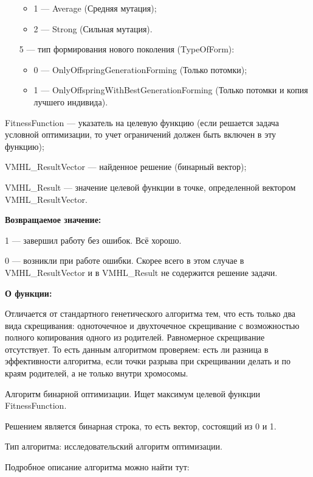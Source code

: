 \documentclass[a4paper,12pt]{article}
\begin{document}
\begin{itemize}
\begin{itemize}
       \item 1 --- Average (Средняя мутация);
 
       \item 2 --- Strong (Сильная мутация).
	    \end{itemize}
 
 \item [5] --- тип формирования нового поколения (TypeOfForm):
  \begin{itemize}
       \item 0 --- OnlyOffspringGenerationForming (Только потомки);
 
       \item 1 --- OnlyOffspringWithBestGenerationForming (Только потомки и копия лучшего индивида).
	    \end{itemize}
 \end{itemize}
 
FitnessFunction --- указатель на целевую функцию (если решается задача условной оптимизации, то учет ограничений должен быть включен в эту функцию);
 
VMHL\_ResultVector --- найденное решение (бинарный вектор);
 
VMHL\_Result --- значение целевой функции в точке, определенной вектором VMHL\_ResultVector.

\textbf{Возвращаемое значение:} 

 1 --- завершил работу без ошибок. Всё хорошо.
 
 0 --- возникли при работе ошибки. Скорее всего в этом случае в VMHL\_ResultVector и в VMHL\_Result не содержится решение задачи.

\textbf{О функции:}

Отличается от стандартного генетического алгоритма тем, что есть только два вида скрещивания: одноточечное и двухточечное скрещивание с возможностью полного копирования одного из родителей. Равномерное скрещивание отсутствует. То есть данным алгоритмом проверяем: есть ли разница в эффективности алгоритма, если точки разрыва при скрещивании делать и по краям родителей, а не только внутри хромосомы.

Алгоритм бинарной оптимизации. Ищет максимум целевой функции FitnessFunction.

Решением является бинарная строка, то есть вектор, состоящий из 0 и 1.

Тип алгоритма: исследовательский алгоритм оптимизации.

Подробное описание алгоритма можно найти тут:
\end{document}

